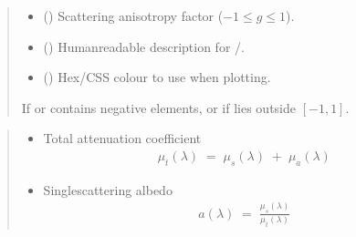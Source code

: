 \documentclass[letterpaper,10pt,english]{sphinxmanual}
\begin{document}
\begin{fulllineitems}
\begin{quote}
\begin{description}
\begin{itemize}
\item {} 
\sphinxAtStartPar
{} () \textendash{} Scattering anisotropy factor
(\(-1 \le g \le 1\)).

\item {} 
\sphinxAtStartPar
{} () \textendash{} Human\sphinxhyphen{}readable description for /.

\item {} 
\sphinxAtStartPar
{} (\sphinxstyleliteralemphasis{\sphinxupquote{ | }}) \textendash{} Hex/CSS colour to use when plotting.

\end{itemize}

\sphinxAtStartPar
{} \textendash{} If  or  contains negative
elements, or if  lies outside \([-1, 1]\).

\end{description}\end{quote}

\sphinxAtStartPar
{}
\begin{quote}\begin{description}
\begin{itemize}
\item {} 
\sphinxAtStartPar
{} \textendash{} 
\sphinxAtStartPar
Total attenuation coefficient
\begin{equation*}
\begin{split}\mu_t(\lambda) \;=\; \mu_s(\lambda)\;+\;\mu_a(\lambda)\end{split}
\end{equation*}

\item {} 
\sphinxAtStartPar
{} \textendash{} 
\sphinxAtStartPar
Single\sphinxhyphen{}scattering albedo
\begin{equation*}
\begin{split}a(\lambda) \;=\; \frac{\mu_s(\lambda)}{\mu_t(\lambda)}\end{split}
\end{equation*}


\end{itemize}
\end{description}
\end{quote}
\end{fulllineitems}
\end{document}
